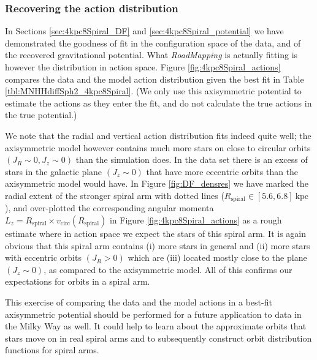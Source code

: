 \documentclass[iop,revtex4,numberedappendix,appendixfloats]{emulateapj}
\newcommand{\RM}{{\sl RoadMapping}}
\begin{document}
\subsubsection{Recovering the action distribution}

In Sections \ref{sec:4kpc8Spiral_DF} and \ref{sec:4kpc8Spiral_potential} we have demonstrated the goodness of fit in the configuration space of the data, and of the recovered gravitational potential. What \RM{} is actually fitting is however the distribution in action space. Figure \ref{fig:4kpc8Spiral_actions} compares the data and the model action distribution given the best fit  in Table \ref{tbl:MNHHdiffSph2_4kpc8Spiral}. (We only use this axisymmetric potential to estimate the actions as they enter the fit, and do not calculate the true actions in the true potential.)

We note that the radial and vertical action distribution fits indeed quite well; the axisymmetric model however contains much more stars on close to circular orbits $(J_R \sim 0,J_z \sim 0)$ than the simulation does. In the data set there is an excess of stars in the galactic plane $(J_z\sim0)$ that have more eccentric orbits  than the axisymmetric model would have. In Figure \ref{fig:DF_densres} we have marked the radial extent of the stronger spiral arm with dotted lines ($R_\text{spiral} \in [5.6,6.8]~\text{kpc}$), and over-plotted the corresponding angular momenta $L_z = R_\text{spiral} \times v_\text{circ}(R_\text{spiral})$ in Figure \ref{fig:4kpc8Spiral_actions} as a rough estimate where in action space we expect the stars of this spiral arm. It is again obvious that this spiral arm contains (i) more stars in general and (ii) more stars with eccentric orbits  $(J_R>0)$ which are (iii) located mostly close to the plane $(J_z\sim0)$, as compared to the axisymmetric model. All of this confirms our expectations for orbits in a spiral arm. 

This exercise of comparing the data and the model actions in a best-fit axisymmetric potential should be performed for a future application to data in the Milky Way as well. It could help to learn about the approximate orbits that stars move on in real spiral arms and to subsequently construct orbit distribution functions for spiral arms.
\end{document}
